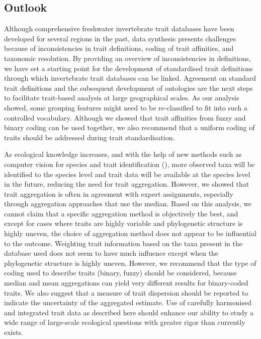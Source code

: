 \documentclass[12pt]{article}
\begin{document}

\subsection*{Outlook}

Although comprehensive freshwater invertebrate trait databases have been developed for several regions in the past, data synthesis presents challenges because of inconsistencies in trait definitions, coding of trait affinities, and taxonomic resolution. By providing an overview of inconsistencies in definitions, we have set a starting point for the development of standardised trait definitions through which invertebrate trait databases can be linked. Agreement on standard trait definitions and the subsequent development of ontologies are the next steps to facilitate trait-based analysis at large geographical scales. As our analysis showed, some grouping features might need to be re-classified to fit into such a controlled vocabulary. Although we showed that trait affinities from fuzzy and binary coding can be used together, we also recommend that a uniform coding of traits should be addressed during trait standardisation. 

As ecological knowledge increases, and with the help of new methods such as computer vision for species and trait identification (\cite{hoye_deep_2020}), more observed taxa will be identified to the species level and trait data will be available at the species level in the future, reducing the need for trait aggregation. However, we showed that trait aggregation is often in agreement with expert assignments, especially through aggregation approaches that use the median. Based on this analysis, we cannot claim that a specific aggregation method is objectively the best, and except for cases where traits are highly variable and phylogenetic structure is highly uneven, the choice of aggregation method does not appear to be influential to the outcome. Weighting trait information based on the taxa present in the database used does not seem to have much influence except when the phylogenetic structure is highly uneven. However, we recommend that the type of coding used to describe traits (binary, fuzzy) should be considered, because median and mean aggregations can yield very different results for binary-coded traits. We also suggest that a measure of trait dispersion should be reported to indicate the uncertainty of the aggregated estimate. Use of carefully harmonised and integrated trait data as described here should enhance our ability to study a wide range of large-scale ecological questions with greater rigor than currently exists.
 
\end{document}
